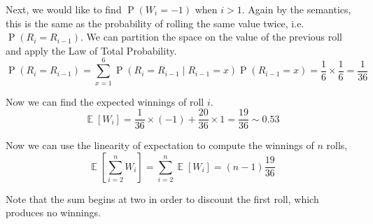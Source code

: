 \documentclass[letterpaper,11pt]{article}
\DeclareMathOperator{\Prob}{P}
\renewcommand{\P}[1]{\Prob{\parens{#1}}}
\DeclareMathOperator{\Expect}{\mathbb{E}}
\newcommand{\E}[1]{\Expect{\left[#1\right]}}
\newcommand{\parens}[1]{\left(#1\right)}
\newcommand{\given}{\;\vert\;}
\begin{document}
Next, we would like to find $\P{W_i = -1}$ when $i > 1$.
Again by the semantics, this is the same as the probability of rolling the same
value twice, i.e. $\P{R_i = R_{i-1}}$. We can partition the space on the value
of the previous roll and apply the Law of Total Probability.
\begin{equation*}
    \P{R_i = R_{i-1}}
    = \sum_{x = 1}^6 {
        \P{R_i = R_{i-1} \given R_{i-1} = x} \P{R_{i-1} = x}
    }
    = \frac{1}{6} \times \frac{1}{6}
    = \frac{1}{36}
\end{equation*}

Now we can find the expected winnings of roll $i$.
\begin{equation*}
    \E{W_i}
    = \frac{1}{36} \times (-1)
    + \frac{20}{36} \times 1
    = \frac{19}{36}
    \sim 0.53
\end{equation*}

Now we can use the linearity of expectation to compute the winnings of $n$
rolls,
\begin{equation*}
    \E{\sum_{i=2}^n W_i} = \sum_{i=2}^n \E{W_i} = (n-1)\frac{19}{36}
\end{equation*}

Note that the sum begins at two in order to discount the first roll, which
produces no winnings.
\end{document}
